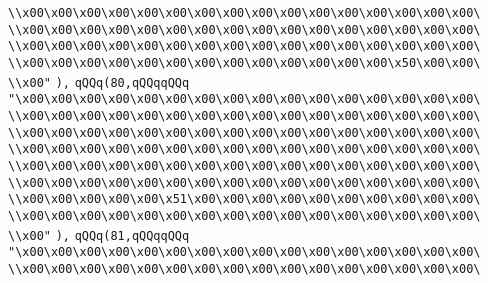 \verb|\\x00\x00\x00\x00\x00\x00\x00\x00\x00\x00\x00\x00\x00\x00\x00\x00\|\newline
\verb|\\x00\x00\x00\x00\x00\x00\x00\x00\x00\x00\x00\x00\x00\x00\x00\x00\|\newline
\verb|\\x00\x00\x00\x00\x00\x00\x00\x00\x00\x00\x00\x00\x00\x00\x00\x00\|\newline
\verb|\\x00\x00\x00\x00\x00\x00\x00\x00\x00\x00\x00\x00\x00\x50\x00\x00\|\newline
\verb|\\x00"|\newline
\verb|),|\newline
\verb|qQQq(80,qQQqqQQq|\newline
\verb|"\x00\x00\x00\x00\x00\x00\x00\x00\x00\x00\x00\x00\x00\x00\x00\x00\|\newline
\verb|\\x00\x00\x00\x00\x00\x00\x00\x00\x00\x00\x00\x00\x00\x00\x00\x00\|\newline
\verb|\\x00\x00\x00\x00\x00\x00\x00\x00\x00\x00\x00\x00\x00\x00\x00\x00\|\newline
\verb|\\x00\x00\x00\x00\x00\x00\x00\x00\x00\x00\x00\x00\x00\x00\x00\x00\|\newline
\verb|\\x00\x00\x00\x00\x00\x00\x00\x00\x00\x00\x00\x00\x00\x00\x00\x00\|\newline
\verb|\\x00\x00\x00\x00\x00\x00\x00\x00\x00\x00\x00\x00\x00\x00\x00\x00\|\newline
\verb|\\x00\x00\x00\x00\x00\x51\x00\x00\x00\x00\x00\x00\x00\x00\x00\x00\|\newline
\verb|\\x00\x00\x00\x00\x00\x00\x00\x00\x00\x00\x00\x00\x00\x00\x00\x00\|\newline
\verb|\\x00"|\newline
\verb|),|\newline
\verb|qQQq(81,qQQqqQQq|\newline
\verb|"\x00\x00\x00\x00\x00\x00\x00\x00\x00\x00\x00\x00\x00\x00\x00\x00\|\newline
\verb|\\x00\x00\x00\x00\x00\x00\x00\x00\x00\x00\x00\x00\x00\x00\x00\x00\|\newline
